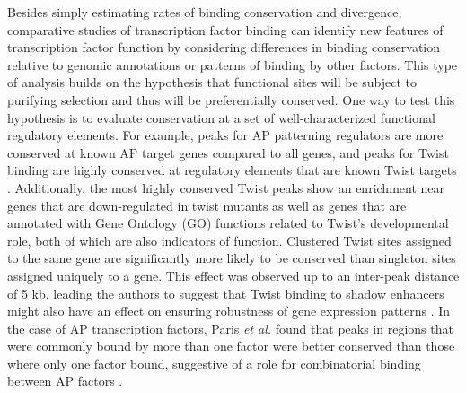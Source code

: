Besides simply estimating rates of binding conservation and divergence, comparative studies of transcription factor binding can identify new features of transcription factor function by considering differences in binding conservation relative to genomic annotations or patterns of binding by other factors. This type of analysis builds on the hypothesis that functional sites will be subject to purifying selection and thus will be preferentially conserved. One way to test this hypothesis is to evaluate conservation at a set of well-characterized functional regulatory elements. For example, peaks for AP patterning regulators are more conserved at known AP target genes compared to all genes, and peaks for Twist binding are highly conserved at regulatory elements that are known Twist targets \citep{bradley_binding_2010,he_high_2011,paris_extensive_2013}. Additionally, the most highly conserved Twist peaks show an enrichment near genes that are down-regulated in twist mutants as well as genes that are annotated with Gene Ontology (GO) functions related to Twist’s developmental role, both of which are also indicators of function. Clustered Twist sites assigned to the same gene are significantly more likely to be conserved than singleton sites assigned uniquely to a gene. This effect was observed up to an inter-peak distance of 5 kb, leading the authors to suggest that Twist binding to shadow enhancers might also have an effect on ensuring robustness of gene expression patterns \citep{he_high_2011}. In the case of AP transcription factors, Paris \emph{et al.} found that peaks in regions that were commonly bound by more than one factor were better conserved than those where only one factor bound, suggestive of a role for combinatorial binding between AP factors \citep{paris_extensive_2013}.\\

